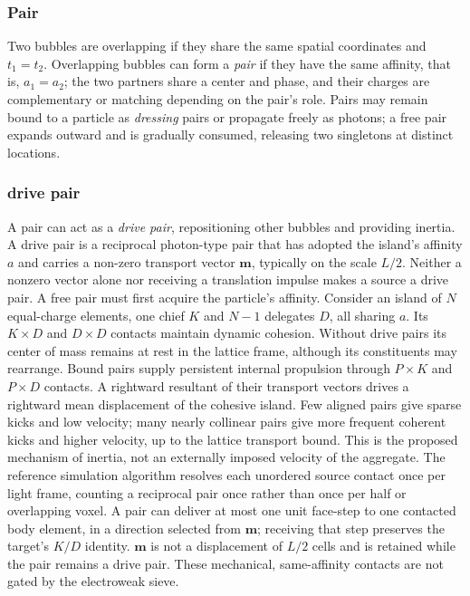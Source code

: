 \documentclass[a4paper]{article}
\begin{document}
\subsubsection{Pair}
Two bubbles are overlapping if they share the same spatial coordinates and $t_1=t_2$. Overlapping bubbles can form a \emph{pair} if they have the same affinity, that is, $a_1=a_2$; the two partners share a center and phase, and their charges are complementary or matching depending on the pair's role. Pairs may remain bound to a particle as \emph{dressing} pairs or propagate freely as photons; a free pair expands outward and is gradually consumed, releasing two singletons at distinct locations.
\subsubsection{drive pair} \label{subsubsec:drive pair}
A pair can act as a \textit{drive pair}, repositioning other bubbles and providing inertia.
A drive pair is a reciprocal photon-type pair that has adopted the island's affinity $a$ and carries a non-zero transport vector $\boldsymbol{m}$, typically on the scale $L/2$. Neither a nonzero vector alone nor receiving a translation impulse makes a source a drive pair. A free pair must first acquire the particle's affinity.
Consider an island of $N$ equal-charge elements, one chief $K$ and $N-1$ delegates $D$, all sharing $a$. Its $K\times D$ and $D\times D$ contacts maintain dynamic cohesion. Without drive pairs its center of mass remains at rest in the lattice frame, although its constituents may rearrange. Bound pairs supply persistent internal propulsion through $P\times K$ and $P\times D$ contacts. A rightward resultant of their transport vectors drives a rightward mean displacement of the cohesive island. Few aligned pairs give sparse kicks and low velocity; many nearly collinear pairs give more frequent coherent kicks and higher velocity, up to the lattice transport bound. This is the proposed mechanism of inertia, not an externally imposed velocity of the aggregate.
The reference simulation algorithm resolves each unordered source contact once per light frame, counting a reciprocal pair once rather than once per half or overlapping voxel. A pair can deliver at most one unit face-step to one contacted body element, in a direction selected from $\boldsymbol{m}$; receiving that step preserves the target's $K/D$ identity. $\boldsymbol{m}$ is not a displacement of $L/2$ cells and is retained while the pair remains a drive pair. These mechanical, same-affinity contacts are not gated by the electroweak sieve.
\end{document}
